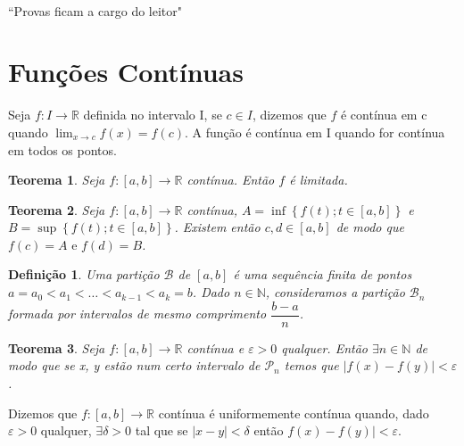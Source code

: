 \documentclass[12pt]{article}
\newtheorem{theorem}{Teorema}[section]
\newtheorem{definition}{Definição}
\begin{document}
\textbf{}
\vspace{4mm} \\
\textbf{}
\vspace{4mm}

\textbf{}
\vspace{4mm}


\newpage

\begin{center}
    ``Provas ficam a cargo do leitor"
\end{center}

\section{Funções Contínuas}
\label{s1}

Seja $f: I \rightarrow{} \mathbb{R}$ definida no intervalo I, se $c \in I$, dizemos que $f$ é contínua em c quando $\lim_{x \rightarrow{} c} f(x) = f(c)$. A função é contínua em I quando for contínua em todos os pontos.

\begin{theorem}
 Seja $f: [a, b] \rightarrow{} \mathbb{R}$ contínua. Então $f$ é limitada.
\end{theorem}

\begin{theorem}
  Seja $f: [a, b] \rightarrow{} \mathbb{R}$ contínua, $A = \inf \left\{ f(t); t \in [a, b] \right\}$ e $B = \sup \left\{ f(t) ; t \in [a, b] \right\}$. Existem então $c, d \in [a, b]$ de modo que $f(c) = A \text{ e } f(d) = B$.
\end{theorem}

\begin{definition}
    Uma partição $\mathcal{B}$ de $[a, b]$ é uma sequência finita de pontos $a = a_0 < a_1 < \dots < a_{k-1} < a_k = b$. Dado $n \in \mathbb{N}$, consideramos a partição $\mathcal{B}_n$ formada por intervalos de mesmo comprimento $\dfrac{b-a}{n}$.
\end{definition}

\begin{theorem}
  Seja $f: [a, b] \rightarrow{} \mathbb{R}$ contínua e $\varepsilon > 0$ qualquer. Então $\exists n \in \mathbb{N}$ de modo que se x, y estão num certo intervalo de $\mathcal{P}_n$ temos que $|f(x) - f(y)| < \varepsilon$.
\end{theorem}

Dizemos que $f: [a, b] \rightarrow{} \mathbb{R}$ contínua é uniformemente contínua quando, dado $\varepsilon > 0$ qualquer, $\exists \delta > 0$ tal que se $|x-y| < \delta$ então $f(x) - f(y)| < \varepsilon$.
\end{document}
